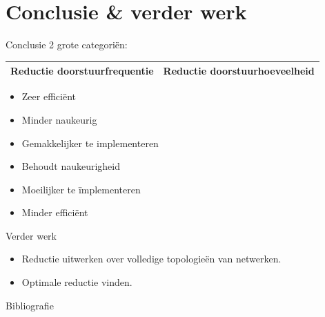 \documentclass[presentation, bigger]{beamer}
\begin{document}
\section{Conclusie \& verder werk}
\begin{frame}{Conclusie}
2 grote categoriën:
\vspace{1cm}
\begin{tabular}{ p{5.5cm}  p{5.5cm} }
     \toprule
    Reductie doorstuurfrequentie & Reductie doorstuurhoeveelheid   \\ 
    \toprule
\end{tabular}    

\begin{minipage}{.5\textwidth}
     \begin{itemize}
     \item Zeer efficiënt
     \item Minder naukeurig
     \item Gemakkelijker te implementeren
     \end{itemize}
      
    \end{minipage}%
    \begin{minipage}{.5\textwidth}
	\begin{itemize}
	\item Behoudt naukeurigheid
	\item Moeilijker te ïmplementeren
	\item Minder efficiënt
	\end{itemize}
    \end{minipage}
\vspace{2cm}
\hspace{2.5cm}
\end{frame}

\begin{frame}{Verder werk}
\begin{itemize}
\item Reductie uitwerken over volledige topologieën van netwerken.
\item Optimale reductie vinden.
\end{itemize}
\end{frame}

\begin{frame}[allowframebreaks]{Bibliografie}

  \nocite{*}
  \printbibliography
\end{frame}
\end{document}
